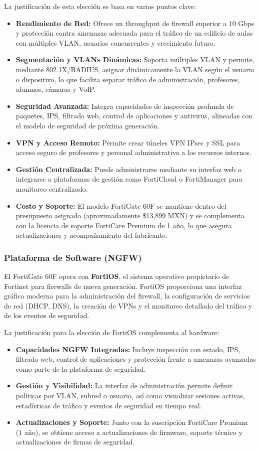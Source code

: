 La justificación de esta elección se basa en varios puntos clave:
\begin{itemize}
    \item \textbf{Rendimiento de Red:} Ofrece un throughput de firewall superior a 10 Gbps y protección contra amenazas adecuada para el tráfico de un edificio de aulas con múltiples VLAN, usuarios concurrentes y crecimiento futuro.
    \item \textbf{Segmentación y VLANs Dinámicas:} Soporta múltiples VLAN y permite, mediante 802.1X/RADIUS, asignar dinámicamente la VLAN según el usuario o dispositivo, lo que facilita separar tráfico de administración, profesores, alumnos, cámaras y VoIP.
    \item \textbf{Seguridad Avanzada:} Integra capacidades de inspección profunda de paquetes, IPS, filtrado web, control de aplicaciones y antivirus, alineadas con el modelo de seguridad de próxima generación.
    \item \textbf{VPN y Acceso Remoto:} Permite crear túneles VPN IPsec y SSL para acceso seguro de profesores y personal administrativo a los recursos internos.
    \item \textbf{Gestión Centralizada:} Puede administrarse mediante su interfaz web o integrarse a plataformas de gestión como FortiCloud o FortiManager para monitoreo centralizado.
    \item \textbf{Costo y Soporte:} El modelo FortiGate 60F se mantiene dentro del presupuesto asignado (aproximadamente \$13,899 MXN) y se complementa con la licencia de soporte FortiCare Premium de 1 a\~no, lo que asegura actualizaciones y acompañamiento del fabricante.
\end{itemize}

\subsubsection{Plataforma de Software (NGFW)}
El FortiGate 60F opera con \textbf{FortiOS}, el sistema operativo propietario de Fortinet para firewalls de nueva generación. FortiOS proporciona una interfaz gráfica moderna para la administración del firewall, la configuración de servicios de red (DHCP, DNS), la creación de VPNs y el monitoreo detallado del tráfico y de los eventos de seguridad.

La justificación para la elección de FortiOS complementa al hardware:
\begin{itemize}
    \item \textbf{Capacidades NGFW Integradas:} Incluye inspección con estado, IPS, filtrado web, control de aplicaciones y protección frente a amenazas avanzadas como parte de la plataforma de seguridad.
    \item \textbf{Gestión y Visibilidad:} La interfaz de administración permite definir políticas por VLAN, subred o usuario, así como visualizar sesiones activas, estadísticas de tráfico y eventos de seguridad en tiempo real.
    \item \textbf{Actualizaciones y Soporte:} Junto con la suscripción FortiCare Premium (1 año), se obtiene acceso a actualizaciones de firmware, soporte técnico y actualizaciones de firmas de seguridad.
\end{itemize}